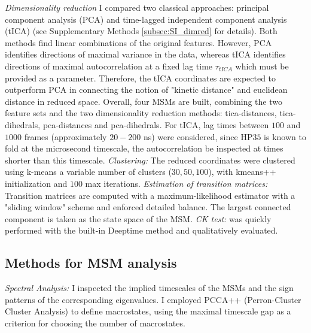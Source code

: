 \documentclass[prl,twocolumn]{revtex4-1}
\begin{document}
\newline \textit{Dimensionality reduction}
I compared two classical approaches: principal component analysis (PCA) and time-lagged independent component analysis (tICA) (see Supplementary Methods \ref{subsec:SI_dimred} for details).
Both methods find linear combinations of the original features. However, PCA identifies directions of maximal variance in the data, whereas tICA identifies directions of maximal autocorrelation at a fixed lag time $\tau_{tICA}$ which must be provided as a parameter.  Therefore, the tICA coordinates are expected to 
outperform PCA in connecting the notion of "kinetic distance" and euclidean distance in reduced space. Overall, four MSMs are built, combining the two feature sets and the two dimensionality reduction methods: tica-distances, tica-dihedrals, pca-distances and pca-dihedrals. For tICA, lag times between $100$ and $1000$ frames (approximately $20-200$ ns) were considered, since HP$35$ is known to fold at the microsecond timescale, 
the autocorrelation  be inspected at times shorter than this timescale.
\vspace{0.1em}\newline
\textit{Clustering:}
The reduced coordinates were clustered using k-means a variable number of clusters ($30, 50, 100$), with kmeans++ initialization and $100$ max iterations. 
\vspace{0.1em}\newline
\textit{Estimation of transition matrices:}
Transition matrices are computed with a maximum-likelihood estimator with a "sliding window" scheme  \cite[Chap. 4.1]{thebible} and enforced detailed balance.
The largest connected component is taken as the state space of the MSM.
\vspace{0.1em}\newline
\textit{CK test:} was quickly performed with the built-in Deeptime method and qualitatively evaluated.
%
%
\subsection{Methods for MSM analysis}
\textit{Spectral Analysis:} I inspected the implied timescales of the MSMs and the sign patterns of the corresponding eigenvalues. I employed PCCA++ (Perron-Cluster Cluster Analysis) \cite[Ch. 2.5.1 and 2.5.2]{thebible} to define macrostates, using the maximal timescale gap as a criterion for choosing the number of macrostates.
%
%
%
%
%
%
\end{document}
